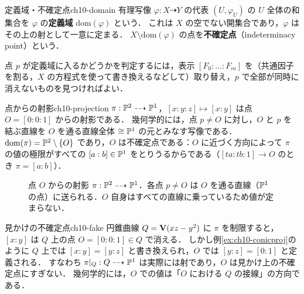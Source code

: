 \begin{mydef}{定義域・不確定点}{ch10-domain}
有理写像 $\varphi:X\dashrightarrow Y$ の代表 $(U,\varphi_U)$ の $U$ 全体の和集合を $\varphi$ の\textbf{定義域} $\mathrm{dom}(\varphi)$ という．
これは $X$ の空でない開集合であり，$\varphi$ はその上の射として一意に定まる．
$X\setminus\mathrm{dom}(\varphi)$ の点を\textbf{不確定点}（indeterminacy point）という．
\end{mydef}

点 $p$ が定義域に入るかどうかを判定するには，表示 $[F_0:\dots:F_m]$ を（共通因子を割る，$X$ の方程式を使って書き換えるなどして）取り替え，$p$ で全部が同時に消えないものを見つければよい．

\begin{myex}{点からの射影}{ch10-projection}
$\pi:\mathbb{P}^2\dashrightarrow\mathbb{P}^1$，$[x:y:z]\mapsto[x:y]$ は点 $O=[0:0:1]$ からの射影である．
幾何学的には，点 $p\neq O$ に対し，$O$ と $p$ を結ぶ直線を $O$ を通る直線全体 $\cong\mathbb{P}^1$ の元とみなす写像である．
$\mathrm{dom}(\pi)=\mathbb{P}^2\setminus\{O\}$ であり，$O$ は不確定点である：$O$ に近づく方向によって $\pi$ の値の極限がすべての $[a:b]\in\mathbb{P}^1$ をとりうるからである（$[ta:tb:1]\to O$ のとき $\pi=[a:b]$）．
\end{myex}

\begin{figure}[htbp]
\centering
{}
\caption{点 $O$ からの射影 $\pi:\mathbb{P}^2\dashrightarrow\mathbb{P}^1$．各点 $p\neq O$ は $O$ を通る直線（$\mathbb{P}^1$ の点）に送られる．$O$ 自身はすべての直線に乗っているため値が定まらない．}
\label{fig:ch10-projection}
\end{figure}

\begin{myex}{見かけの不確定点}{ch10-fake}
円錐曲線 $Q=\mathbf{V}(xz-y^2)$ に $\pi$ を制限すると，$[x:y]$ は $Q$ 上の点 $O=[0:0:1]\in Q$ で消える．
しかし例\ref{ex:ch10-conicproj}のように $Q$ 上では $[x:y]=[y:z]$ と書き換えられ，$O$ では $[y:z]=[0:1]$ と定義される．
すなわち $\pi|_Q:Q\dashrightarrow\mathbb{P}^1$ は実際には射であり，$O$ は見かけ上の不確定点にすぎない．
幾何学的には，$O$ での値は「$O$ における $Q$ の接線」の方向である．
\end{myex}

